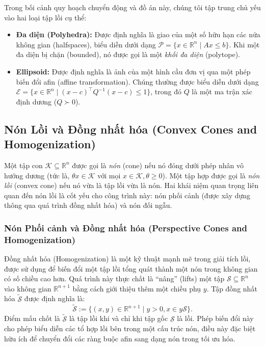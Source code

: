 Trong bối cảnh quy hoạch chuyển động và đồ án này, chúng tôi tập trung chủ yếu vào hai loại tập lồi cụ thể:
\begin{itemize}
\item \textbf{Đa diện (Polyhedra):} Được định nghĩa là giao của một số hữu hạn các nửa không gian (halfspaces), biểu diễn dưới dạng $\mathcal{P} = \{x \in \mathbb{R}^n \mid Ax \leq b\}$. Khi một đa diện bị chặn (bounded), nó được gọi là một \textit{khối đa diện} (polytope).
\item \textbf{Ellipsoid:} Được định nghĩa là ảnh của một hình cầu đơn vị qua một phép biến đổi afin (affine transformation). Chúng thường được biểu diễn dưới dạng $\mathcal{E} = \{x \in \mathbb{R}^n \mid (x-c)^\top Q^{-1} (x-c) \leq 1\}$, trong đó $Q$ là một ma trận xác định dương ($Q \succ 0$).
\end{itemize}

\subsection{Nón Lồi và Đồng nhất hóa (Convex Cones and Homogenization)}
Một tập con $\mathcal{K} \subseteq \mathbb{R}^n$ được gọi là \textit{nón} (cone) nếu nó đóng dưới phép nhân vô hướng dương (tức là, $\theta x \in \mathcal{K}$ với mọi $x \in \mathcal{K}, \theta \geq 0$). Một tập hợp được gọi là \textit{nón lồi} (convex cone) nếu nó vừa là tập lồi vừa là nón. Hai khái niệm quan trọng liên quan đến nón lồi là cốt yếu cho công trình này: nón phối cảnh (được xây dựng thông qua quá trình đồng nhất hóa) và nón đối ngẫu.

\subsubsection{Nón Phối cảnh và Đồng nhất hóa (Perspective Cones and Homogenization)}
Đồng nhất hóa (Homogenization) là một kỹ thuật mạnh mẽ trong giải tích lồi, được sử dụng để biến đổi một tập lồi tổng quát thành một nón trong không gian có số chiều cao hơn. Quá trình này thực chất là ``nâng'' (lifts) một tập $\mathcal{S} \subseteq \mathbb{R}^n$ vào không gian $\mathbb{R}^{n+1}$ bằng cách giới thiệu thêm một chiều phụ $y$. Tập đồng nhất hóa $\widetilde{\mathcal{S}}$ được định nghĩa là:
\begin{equation}
\widetilde{\mathcal{S}} := \{(x, y) \in \mathbb{R}^{n+1} \mid y > 0, x \in y\mathcal{S}\}.
\label{eq:homogenization_def}
\end{equation}
Điểm mấu chốt là $\widetilde{\mathcal{S}}$ là tập lồi khi và chỉ khi tập gốc $\mathcal{S}$ là lồi. Phép biến đổi này cho phép biểu diễn các tổ hợp lồi bên trong một cấu trúc nón, điều này đặc biệt hữu ích để chuyển đổi các ràng buộc afin sang dạng nón trong tối ưu hóa.

